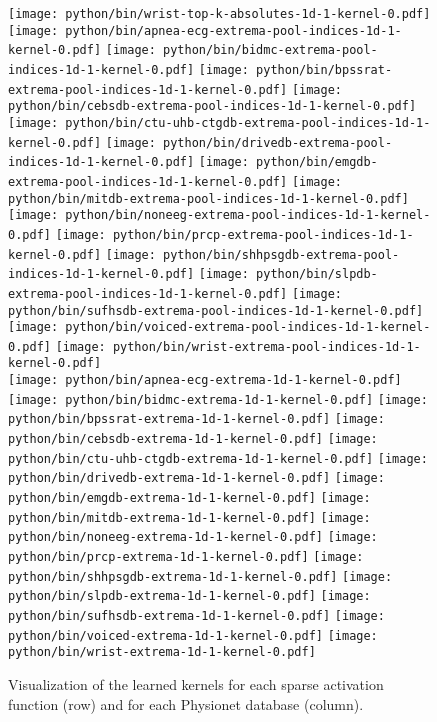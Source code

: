 \documentclass[journal]{IEEEtran}
\begin{document}
\begin{figure*}[!t]
	\texttt{[image: python/bin/wrist-top-k-absolutes-1d-1-kernel-0.pdf]}
	\\
	\texttt{[image: python/bin/apnea-ecg-extrema-pool-indices-1d-1-kernel-0.pdf]}
	\texttt{[image: python/bin/bidmc-extrema-pool-indices-1d-1-kernel-0.pdf]}
	\texttt{[image: python/bin/bpssrat-extrema-pool-indices-1d-1-kernel-0.pdf]}
	\texttt{[image: python/bin/cebsdb-extrema-pool-indices-1d-1-kernel-0.pdf]}
	\texttt{[image: python/bin/ctu-uhb-ctgdb-extrema-pool-indices-1d-1-kernel-0.pdf]}
	\texttt{[image: python/bin/drivedb-extrema-pool-indices-1d-1-kernel-0.pdf]}
	\texttt{[image: python/bin/emgdb-extrema-pool-indices-1d-1-kernel-0.pdf]}
	\texttt{[image: python/bin/mitdb-extrema-pool-indices-1d-1-kernel-0.pdf]}
	\texttt{[image: python/bin/noneeg-extrema-pool-indices-1d-1-kernel-0.pdf]}
	\texttt{[image: python/bin/prcp-extrema-pool-indices-1d-1-kernel-0.pdf]}
	\texttt{[image: python/bin/shhpsgdb-extrema-pool-indices-1d-1-kernel-0.pdf]}
	\texttt{[image: python/bin/slpdb-extrema-pool-indices-1d-1-kernel-0.pdf]}
	\texttt{[image: python/bin/sufhsdb-extrema-pool-indices-1d-1-kernel-0.pdf]}
	\texttt{[image: python/bin/voiced-extrema-pool-indices-1d-1-kernel-0.pdf]}
	\texttt{[image: python/bin/wrist-extrema-pool-indices-1d-1-kernel-0.pdf]}
	\\
	\texttt{[image: python/bin/apnea-ecg-extrema-1d-1-kernel-0.pdf]}
	\texttt{[image: python/bin/bidmc-extrema-1d-1-kernel-0.pdf]}
	\texttt{[image: python/bin/bpssrat-extrema-1d-1-kernel-0.pdf]}
	\texttt{[image: python/bin/cebsdb-extrema-1d-1-kernel-0.pdf]}
	\texttt{[image: python/bin/ctu-uhb-ctgdb-extrema-1d-1-kernel-0.pdf]}
	\texttt{[image: python/bin/drivedb-extrema-1d-1-kernel-0.pdf]}
	\texttt{[image: python/bin/emgdb-extrema-1d-1-kernel-0.pdf]}
	\texttt{[image: python/bin/mitdb-extrema-1d-1-kernel-0.pdf]}
	\texttt{[image: python/bin/noneeg-extrema-1d-1-kernel-0.pdf]}
	\texttt{[image: python/bin/prcp-extrema-1d-1-kernel-0.pdf]}
	\texttt{[image: python/bin/shhpsgdb-extrema-1d-1-kernel-0.pdf]}
	\texttt{[image: python/bin/slpdb-extrema-1d-1-kernel-0.pdf]}
	\texttt{[image: python/bin/sufhsdb-extrema-1d-1-kernel-0.pdf]}
	\texttt{[image: python/bin/voiced-extrema-1d-1-kernel-0.pdf]}
	\texttt{[image: python/bin/wrist-extrema-1d-1-kernel-0.pdf]}
	\caption{Visualization of the learned kernels for each sparse activation function (row) and for each Physionet database (column).
	}\label{fig:kernelvisualization}
\end{figure*}
\end{document}
